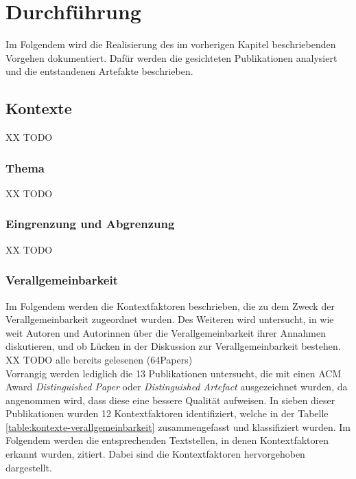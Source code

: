 \chapter{Durchführung}
\label{chapter:impl}
Im Folgendem wird die Realisierung des im vorherigen Kapitel beschriebenden Vorgehen dokumentiert. Dafür werden  die gesichteten Publikationen analysiert und die entstandenen Artefakte beschrieben. 

\section{Kontexte}
XX TODO \\

\subsection{Thema}
XX TODO \\

\subsection{Eingrenzung und Abgrenzung}
XX TODO \\

\clearpage
\subsection{Verallgemeinbarkeit}

Im Folgendem werden die Kontextfaktoren beschrieben, die zu dem Zweck der Verallgemeinbarkeit zugeordnet wurden. Des Weiteren wird untersucht, in wie weit Autoren und Autorinnen über die Verallgemeinbarkeit ihrer Annahmen diskutieren, und ob Lücken in der Diskussion zur Verallgemeinbarkeit bestehen. \\

XX TODO alle bereits gelesenen (64Papers) \\
Vorrangig werden lediglich die 13 Publikationen untersucht, die mit einen ACM Award \textit{Distinguished Paper} oder \textit{Distinguished Artefact} ausgezeichnet wurden, da angenommen wird, dass diese eine bessere Qualität aufweisen. In sieben dieser Publikationen wurden 12 Kontextfaktoren identifiziert, welche in der Tabelle \ref{table:kontexte-verallgemeinbarkeit} zusammengefasst und klassifiziert wurden. Im Folgendem werden die entsprechenden Textstellen, in denen Kontextfaktoren erkannt wurden, zitiert. Dabei sind die Kontextfaktoren hervorgehoben dargestellt. \\

